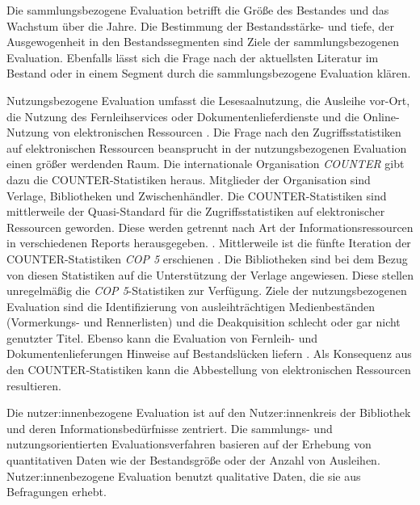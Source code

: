 Die sammlungsbezogene Evaluation betrifft die Größe des Bestandes und das Wachstum über die Jahre. Die Bestimmung der Bestandsstärke- und tiefe, 
der Ausgewogenheit in den Bestandssegmenten sind Ziele der sammlungsbezogenen Evaluation. 
Ebenfalls lässt sich die Frage nach der aktuellsten Literatur im Bestand oder in einem Segment durch die sammlungsbezogene Evaluation klären.

Nutzungsbezogene Evaluation umfasst die Lesesaalnutzung, die Ausleihe vor-Ort, die Nutzung des Fernleihservices oder Dokumentenlieferdienste und die Online-Nutzung von elektronischen Ressourcen \cite[vgl.][254 ff.]{johannsen_jochen_bestands-_2015}.
Die Frage nach den Zugriffsstatistiken auf elektronischen Ressourcen beansprucht in der nutzungsbezogenen Evaluation einen größer werdenden Raum.
Die internationale Organisation \textit{\acrfull{COUNTER}} gibt dazu die COUNTER-Statistiken heraus. Mitglieder der Organisation sind Verlage, Bibliotheken
und Zwischenhändler. Die COUNTER-Statistiken sind mittlerweile der Quasi-Standard für die Zugriffsstatistiken 
auf elektronischer Ressourcen geworden. Diese werden getrennt nach Art der Informationsressourcen in verschiedenen Reports herausgegeben. \cite[vgl.][260 ff.]{johannsen_jochen_bestands-_2015}. 
Mittlerweile ist die fünfte Iteration der COUNTER-Statistiken \textit{\acrshort{COP 5}} erschienen \cite[vgl.][]{counter_abstract_2020}.
Die Bibliotheken sind bei dem Bezug von diesen Statistiken auf die Unterstützung der Verlage angewiesen. Diese stellen unregelmäßig die \textit{\acrshort{COP 5}}-Statistiken zur
Verfügung. Ziele der nutzungsbezogenen Evaluation sind die Identifizierung von ausleihträchtigen Medienbeständen (Vormerkungs- und Rennerlisten) und
die Deakquisition schlecht oder gar nicht genutzter Titel. Ebenso kann die Evaluation von Fernleih- und Dokumentenlieferungen Hinweise auf Bestandslücken liefern
\cite[vgl.][255 ff.]{johannsen_jochen_bestands-_2015}. Als Konsequenz aus den COUNTER-Statistiken kann die Abbestellung von elektronischen Ressourcen resultieren.

Die nutzer:innenbezogene Evaluation ist auf den Nutzer:innenkreis der Bibliothek und deren Informationsbedürfnisse zentriert. 
Die sammlungs- und nutzungsorientierten Evaluationsverfahren basieren auf der Erhebung von quantitativen Daten wie der Bestandsgröße oder der Anzahl von Ausleihen. 
Nutzer:innenbezogene Evaluation benutzt qualitative Daten, die sie aus Befragungen erhebt.

